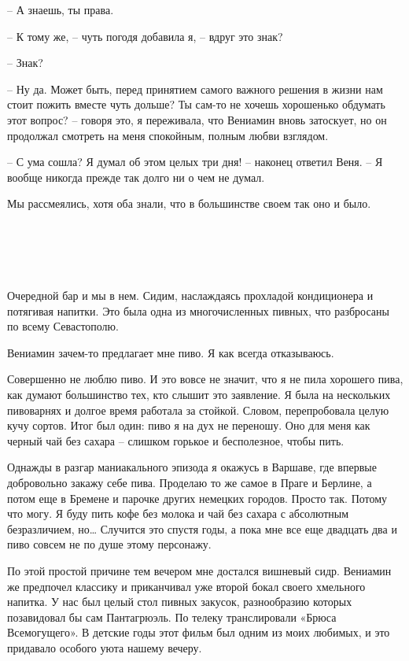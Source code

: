 \documentclass[
]{book}
\begin{document}
-- А знаешь, ты права.

-- К тому же, -- чуть погодя добавила я, -- вдруг это знак?

-- Знак?

-- Ну да. Может быть, перед принятием самого важного решения в жизни нам стоит пожить вместе чуть дольше? Ты сам-то не хочешь хорошенько обдумать этот вопрос? -- говоря это, я переживала, что Вениамин вновь затоскует, но он продолжал смотреть на меня спокойным, полным любви взглядом.

-- С ума сошла? Я думал об этом целых три дня! -- наконец ответил Веня. -- Я вообще никогда прежде так долго ни о чем не думал.

Мы рассмеялись, хотя оба знали, что в большинстве своем так оно и было.

\hypertarget{chapter-15}{%
\chapter{~}\label{chapter-15}}

Очередной бар и мы в нем. Сидим, наслаждаясь прохладой кондиционера и потягивая напитки. Это была одна из многочисленных пивных, что разбросаны по всему Севастополю.

Вениамин зачем-то предлагает мне пиво. Я как всегда отказываюсь.

Совершенно не люблю пиво. И это вовсе не значит, что я не пила хорошего пива, как думают большинство тех, кто слышит это заявление. Я была на нескольких пивоварнях и долгое время работала за стойкой. Словом, перепробовала целую кучу сортов. Итог был один: пиво я на дух не переношу. Оно для меня как черный чай без сахара -- слишком горькое и бесполезное, чтобы пить.

Однажды в разгар маниакального эпизода я окажусь в Варшаве, где впервые добровольно закажу себе пива. Проделаю то же самое в Праге и Берлине, а потом еще в Бремене и парочке других немецких городов. Просто так. Потому что могу. Я буду пить кофе без молока и чай без сахара с абсолютным безразличием, но\ldots{} Случится это спустя годы, а пока мне все еще двадцать два и пиво совсем не по душе этому персонажу.

По этой простой причине тем вечером мне достался вишневый сидр. Вениамин же предпочел классику и приканчивал уже второй бокал своего хмельного напитка. У нас был целый стол пивных закусок, разнообразию которых позавидовал бы сам Пантагрюэль. По телеку транслировали «Брюса Всемогущего». В детские годы этот фильм был одним из моих любимых, и это придавало особого уюта нашему вечеру.
\end{document}
